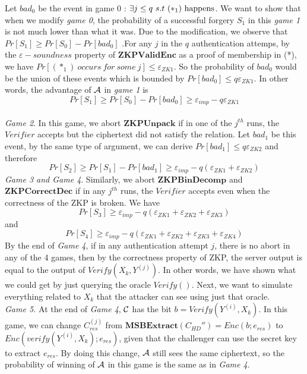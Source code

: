 Let $bad_0$ be the event in game 0 : $\exists j \leq q\ s.t\ (*_1)\ \textnormal{happens}$. We want to show that when we
modify \textit{game 0}, the probability of a successful forgery $S_1$ in this \textit{game 1} is not much lower than
what it was. Due to the modification, we observe that $ Pr[S_1] \geq Pr[S_0] - Pr[bad_0] $ .For any $j$ in the $q$
authentication attemps, by the $\varepsilon-soundness$ property of $\mathbf{ZKPValidEnc}$ as a proof of membership in
(*), we have $Pr[(*_1)\ occurs\ for\ some \ j] \leq \varepsilon_{ZK1}$. So the probability of $bad_0$ would be the union
of these events which is bounded by $Pr[bad_0] \leq q\varepsilon_{ZK1}$. In other words, the advantage of $\mathcal{A}$ in
\textit{game 1} is
\[
  Pr[S_1] \geq Pr[S_0] - Pr[bad_0] \geq \varepsilon_{imp} - q\varepsilon_{ZK1}
\]
\\
\textit{Game 2}. In this game, we abort $\mathbf{ZKPUnpack}$ if in one of the $j^{th}$ runs, the $Verifier$ accepts but
the ciphertext did not satisfy the relation. Let $bad_1$ be this event, by the same type of argument, we can derive
$Pr[bad_1] \leq q\varepsilon_{ZK2}$ and therefore
$$Pr[S_2] \geq Pr[S_1]
- Pr[bad_1] \geq \varepsilon_{imp} - q(\varepsilon_{ZK1}+\varepsilon_{ZK2})
$$
\textit{Game 3 and Game 4}. Similarly, we abort $\mathbf{ZKPBinDecomp}$ and $\mathbf{ZKPCorrectDec}$ if in any $j^{th}$
runs, the $Verifier$ accepts even when the correctness of the ZKP is broken. We have
$$Pr[S_3] \geq  \varepsilon_{imp} - q(\varepsilon_{ZK1}+\varepsilon_{ZK2}
+\varepsilon_{ZK3})
$$ and
$$Pr[S_4] \geq  \varepsilon_{imp} - q(\varepsilon_{ZK1}+\varepsilon_{ZK2} +
\varepsilon_{ZK3} + \varepsilon_{ZK4})
$$
By the end of \textit{Game 4}, if in any authentication attempt $j$, there is no abort in any of the 4 games, then by
the correctness property of ZKP, the server output is equal to the output of $Verify(X_k, Y^{(j)})$. In other words, we
have shown what we could get by just querying the oracle $Verify()$. Next, we want to simulate everything related to
$X_k$ that the attacker can see using
just that oracle.\\
\textit{Game 5.} At the end of \textit{Game 4}, $\mathcal{C}$ has the bit $b = Verify(Y^{(i)},X_k)$. In this game, we
can change $C_{res}^{(j)}$ from $\mathbf{MSBExtract}(C_{HD}'') = Enc(b;e_{res})$ to $Enc(verify(Y^{(i)},X_k);e_{res})$,
given that the challenger can use the secret key to extract $e_{res}$. By doing this change, $\mathcal{A}$ still sees the
same ciphertext, so the probability of winning of $\mathcal{A}$ in this game
is the same as in \textit{Game 4}.\\
